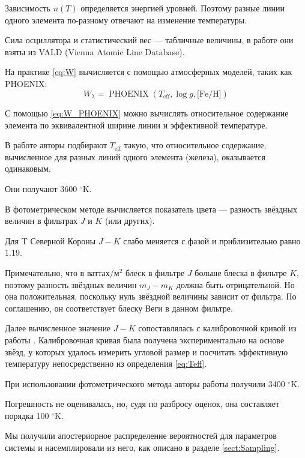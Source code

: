 Зависимость $n(T)$ определяется энергией уровней. Поэтому разные линии одного элемента по-разному отвечают на изменение температуры.

Сила осциллятора и статистический вес --- табличные величины, в работе \cite{TCRBtemperature} они взяты из VALD (Vienna Atomic Line Database).

На практике \eqref{eq:W} вычисляется с помощью атмосферных моделей, таких как PHOENIX:
\begin{equation}
W_\lambda = \operatorname{PHOENIX}(T_\text{eff}, \log g, \text{[Fe/H]})
\label{eq:W_PHOENIX}
\end{equation}

С помощью \eqref{eq:W_PHOENIX} можно вычислять относительное содержание элемента по эквивалентной ширине линии и эффективной температуре.

В работе \cite{TCRBtemperature} авторы подбирают $T_\text{eff}$ такую, что относительное содержание, вычисленное для разных линий одного элемента (железа), оказывается одинаковым.

Они получают 3600 ${}^\circ$K.



В фотометрическом методе вычисляется показатель цвета --- разность звёздных величин в фильтрах $J$ и $K$ (или других).

Для T Северной Короны $J - K$ слабо меняется с фазой и приблизительно равно 1.19.

Примечательно, что в $\text{ваттах}/\text{м}^2$ блеск в фильтре $J$ больше блеска в фильтре $K$, поэтому разность звёздных величин $m_J - m_K$ должна быть отрицательной. Но она положительная, поскольку нуль звёздной величины зависит от фильтра. По соглашению, он соответствует блеску Веги в данном фильтре.

Далее вычисленное значение $J - K$ сопоставлялась с калибровочной кривой из работы \cite{AlonsoCalibration}. Калибровочная кривая была получена экспериментально на основе звёзд, у которых удалось измерить угловой размер и посчитать эффективную температуру непосредственно из определения \eqref{eq:Teff}.

При использовании фотометрического метода авторы работы \cite{TCRBtemperature} получили 3400 ${}^\circ$K.

Погрешность не оценивалась, но, судя по разбросу оценок, она составляет порядка 100 ${}^\circ$K.




Мы получили апостериорное распределение вероятностей для параметров системы и насемплировали из него, как описано в разделе \ref{sect:Sampling}.

